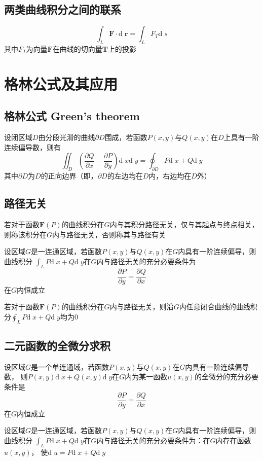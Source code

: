 \documentclass[UTF8]{ctexart}
\newcommand{\dif}[1]{{\mathrm{d}\;\!#1}}
\newcommand{\ve}[1]{{\bm{#1}}}
\newcommand{\emplin}{\vspace{1em}}
\begin{document}
\subsection*{两类曲线积分之间的联系}
\[\int_L\ve{F}\cdot\dif{\ve{r}}=\int_LF_T\dif{s}\]
其中$F_T$为向量$\ve{F}$在曲线的切向量$\ve{T}$上的投影

\emplin

\section*{格林公式及其应用}
\subsection*{格林公式 Green's theorem}

设闭区域$D$由分段光滑的曲线$\partial D$围成，若函数$P(x,y)$与$Q(x,y)$在$D$上具有一阶连续偏导数，则有
\[\iint_D\left(\frac{\partial Q}{\partial x}-\frac{\partial P}{\partial y}\right)\dif{x}\dif{y}
  =\oint_{\partial D}P\dif{x}+Q\dif{y}\]
其中$\partial D$为$D$的正向边界（即，$\partial D$的左边均在$D$内，右边均在$D$外）

\subsection*{路径无关}
若对于函数$\ve{F}(P)$的曲线积分在$G$内与其积分路径无关，仅与其起点与终点相关，
则称该积分在$G$内与路径无关，否则称其与路径有关

\emplin

设区域$G$是一连通区域，若函数$P(x,y)$与$Q(x,y)$在$G$内具有一阶连续偏导，则曲线积分
$\int_LP\dif{x}+Q\dif{y}$在$G$内与路径无关的充分必要条件为
\[\frac{\partial P}{\partial y}=\frac{\partial Q}{\partial x}\]
在$G$内恒成立

\emplin
若对于函数$\ve{F}(P)$的曲线积分在$G$内与路径无关，则沿$G$内任意闭合曲线的曲线积分$\oint_LP\dif{x}+Q\dif{y}$均为$0$

\emplin

\subsection*{二元函数的全微分求积}
设区域$G$是一个单连通域，若函数$P(x,y)$与$Q(x,y)$在$G$内具有一阶连续偏导数，
则$P(x,y)\dif{x}+Q(x,y)\dif{y}$在$G$内为某一函数$u(x,y)$的全微分的充分必要条件是
\[\frac{\partial P}{\partial y}=\frac{\partial Q}{\partial x}\]
在$G$内恒成立

\emplin

设区域$G$是一连通区域，若函数$P(x,y)$与$Q(x,y)$在$G$内具有一阶连续偏导，则曲线积分
$\int_LP\dif{x}+Q\dif{y}$在$G$内与路径无关的充分必要条件为：在$G$内存在函数$u(x,y)$，
使$\dif{u}=P\dif{x}+Q\dif{y}$
\end{document}
